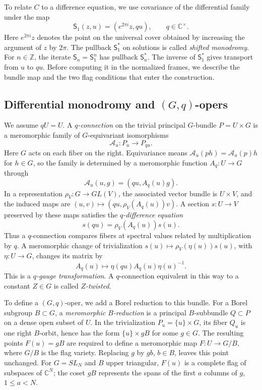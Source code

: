 \documentclass[11pt,leqno]{amsart}
\numberwithin{equation}{section}
\theoremstyle{plain}
\theoremstyle{definition}
\theoremstyle{plain}
\theoremstyle{definition}
\theoremstyle{remark}
\begin{document}
To relate $C$ to a difference equation, we use covariance of the differential family under the map
\[
 \mathsf S_1(z,u)=(e^{2\pi i}z,qu),\qquad q\in\mathbb C^\times.
\]
Here $e^{2\pi i}z$ denotes the point on the universal cover obtained by increasing the argument of $z$ by $2\pi$.  The pullback $\mathsf S_1^*$ on solutions is called \emph{shifted monodromy}.  For $n\in\mathbb Z$, the iterate $\mathsf S_n=\mathsf S_1^n$ has pullback $\mathsf S_n^*$.  The inverse of $\mathsf S_1^*$ gives transport from $u$ to $qu$.  Before computing it in the normalized frames, we describe the bundle map and the two flag conditions that enter the construction.

\subsection{Differential monodromy and \texorpdfstring{$(G,q)$}{(G,q)}-opers}\label{sec:intro-qopers}

We assume $qU=U$.  A \emph{$q$-connection} on the trivial principal $G$-bundle $P=U\times G$ is a meromorphic family of $G$-equivariant isomorphisms
\[
 \mathcal A_u:P_u\longrightarrow P_{qu}.
\]
Here $G$ acts on each fiber on the right.  Equivariance means $\mathcal A_u(ph)=\mathcal A_u(p)h$ for $h\in G$, so the family is determined by a meromorphic function $A_q:U\to G$ through
\[
 \mathcal A_u(u,g)=(qu,A_q(u)g).
\]
In a representation $\rho_V:G\to GL(V)$, the associated vector bundle is $U\times V$, and the induced maps are $(u,v)\mapsto(qu,\rho_V(A_q(u))v)$.  A section $s:U\to V$ preserved by these maps satisfies the \emph{$q$-difference equation}
\[
 s(qu)=\rho_V(A_q(u))s(u).
\]
Thus a $q$-connection compares fibers at spectral values related by multiplication by $q$.  A meromorphic change of trivialization $s(u)\mapsto\rho_V(\eta(u))s(u)$, with $\eta:U\to G$, changes its matrix by
\[
 A_q(u)\longmapsto\eta(qu)A_q(u)\eta(u)^{-1}.
\]
This is a \emph{$q$-gauge transformation}.  A $q$-connection equivalent in this way to a constant $Z\in G$ is called \emph{$Z$-twisted}.

To define a $(G,q)$-oper, we add a Borel reduction to this bundle.  For a Borel subgroup $B\subset G$, a \emph{meromorphic $B$-reduction} is a principal $B$-subbundle $Q\subset P$ on a dense open subset of $U$.  In the trivialization $P_u=\{u\}\times G$, its fiber $Q_u$ is one right $B$-orbit, hence has the form $\{u\}\times gB$ for some $g\in G$.  The resulting points $F(u)=gB$ are required to define a meromorphic map $F:U\to G/B$, where $G/B$ is the flag variety.  Replacing $g$ by $gb$, $b\in B$, leaves this point unchanged.  For $G=SL_N$ and $B$ upper triangular, $F(u)$ is a complete flag of subspaces of $\mathbb C^N$; the coset $gB$ represents the spans of the first $a$ columns of $g$, $1\le a<N$.
\end{document}
